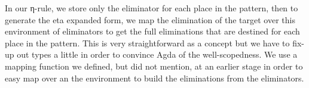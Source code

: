 In our η-rule, we store only the eliminator for each place in the pattern,
then to generate the eta expanded form, we map the elimination of the target
over this environment of eliminators to get the full eliminations that
are destined for each place in the pattern. This is very straightforward
as a concept but we have to fix-up out types a little in order to convince
Agda of the well-scopedness. We use a mapping function we defined, but did not
mention, at an earlier stage in order to easy map over an the environment to
build the eliminations from the eliminators.
\begin{code}%
\>[0]\AgdaSpace{}%
\AgdaSpace{}%
\AgdaSymbol{:}\AgdaSpace{}%
\AgdaSpace{}%
\<%
\\
\>[0][@{}l@{\AgdaIndent{0}}]%
\>[2]\AgdaSpace{}%
\<%
\\
%
\\[\AgdaEmptyExtraSkip]%
%
\>[2]\<%
\\
\>[2][@{}l@{\AgdaIndent{0}}]%
\>[4]%
\>[17]\AgdaSymbol{:}%
\>[20]\<%
\\
%
\>[4]%
\>[17]\AgdaSymbol{:}%
\>[20]\AgdaSpace{}%
\AgdaSpace{}%
\<%
\\
%
\\[\AgdaEmptyExtraSkip]%
%
\>[2]\AgdaSpace{}%
\AgdaSymbol{:}\AgdaSpace{}%
\AgdaSymbol{(}\AgdaSpace{}%
\AgdaSpace{}%
\AgdaSymbol{:}\AgdaSpace{}%
\AgdaSpace{}%
\AgdaSymbol{)}\AgdaSpace{}%
\AgdaSpace{}%
\AgdaSymbol{(}\AgdaSpace{}%
\AgdaSpace{}%
\AgdaSpace{}%
\AgdaSymbol{)}\AgdaSpace{}%
\<%
\\
%
\>[2]\AgdaSpace{}%
\AgdaSymbol{\{}\AgdaSymbol{\}}\AgdaSpace{}%
\AgdaSpace{}%
\<%
\\
\>[2][@{}l@{\AgdaIndent{0}}]%
\>[4]\AgdaSymbol{=}%
\>[85I]\<%
\\
\>[85I][@{}l@{\AgdaIndent{0}}]%
\>[8]\AgdaSpace{}%
\AgdaSymbol{\{}\AgdaSymbol{\}}\AgdaSpace{}%
\AgdaSpace{}%
\AgdaSpace{}%
\AgdaSpace{}%

\end{code}
